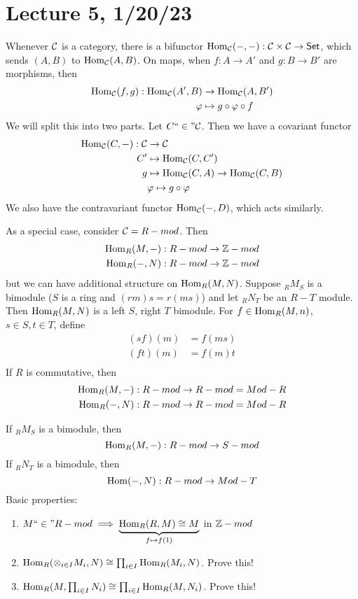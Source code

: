 \documentclass[x11names,reqno,14pt]{extarticle}
\newcommand{\fin}{``\in"}
\begin{document}
\section*{Lecture 5, 1/20/23}

Whenever $\mathcal{C}$ is a category, there is a bifunctor ${\mathrm{Hom}}_{\mathcal{C}}(-,-):\mathcal{C}\times\mathcal{C}\to{{\text{\sffamily {Set}}}}$, which sends $(A, B)$ to ${\mathrm{Hom}}_{\mathcal{C}}(A, B)$. On maps, when $f:A\to A'$ and $g:B\to B'$ are morphisms, then
\begin{align*}
{\mathrm{Hom}}_{\mathcal{C}}(f, g):{\mathrm{Hom}}_{\mathcal{C}}(A', B)& \to {\mathrm{Hom}}_{\mathcal{C}}(A, B') \\
\varphi&\mapsto g \circ \varphi \circ f \\
\end{align*}
We will split this into two parts. Let $C\fin\mc{C}$. Then we have a covariant functor 
\begin{align*}
{\mathrm{Hom}}_{\mathcal{C}}(C,-):\mathcal{C}&\to\mathcal{C}\\
C'&\mapsto{\mathrm{Hom}}_{\mathcal{C}}(C, C') \\
g&\mapsto{\mathrm{Hom}}_{\mathcal{C}}(C, A) \to{\mathrm{Hom}}_{\mathcal{C}}(C, B) \\
& \varphi  \mapsto g \circ \varphi \\
\end{align*}
We also have the contravariant functor ${\mathrm{Hom}}_{\mathcal{C}}(-, D)$, which acts similarly. 

As a special case, consider $\mathcal{C} = R-mod$. Then
\begin{align*}
{\mathrm{Hom}}_R(M, -):R-mod & \to \mathbb{Z}-mod \\
{\mathrm{Hom}}_R(-, N):R-mod & \to \mathbb{Z}-mod \\
\end{align*}
but we can have additional structure on ${\mathrm{Hom}}_R(M, N)$. Suppose $_RM_S$ is a bimodule ($S$ is a ring and $(rm)s = r(ms)$) and let $_RN_T$ be an $R-T$ module. Then ${\mathrm{Hom}}_R(M, N)$ is a left $S$, right $T$ bimodule. For $f \in {\mathrm{Hom}}_R(M, n)$, $s \in S, t \in T$, define 
\begin{align*}
(sf)(m) & = f(ms) \\
(ft)(m) & = f(m)t \\ 
\end{align*}
If $R$ is commutative, then 
\begin{align*}
{\mathrm{Hom}}_R(M, -):R-mod & \to R-mod = Mod-R \\
{\mathrm{Hom}}_R(-, N):R-mod & \to R-mod = Mod-R \\
\end{align*}

If $_RM_S$ is a bimodule, then 
\[
{\mathrm{Hom}}_R(M, -):R-mod \to S-mod
\]
If $_RN_T$ is a bimodule, then
\[
{\mathrm{Hom}}(-, N):R-mod\to Mod-T
\]
Basic properties: 
\begin{enumerate}[label=(\roman*)]
\item $M\fin R-mod \implies \underbrace{\Hom_R(R, M) \cong M}_{f\mapsto f(1)}$ in $\mathbb{Z}-mod$

\item ${\mathrm{Hom}}_R(\otimes_{i\in I}M_i, N) \cong \prod_{i\in I}{\mathrm{Hom}}_R(M_i, N)$. Prove this! 
\item ${\mathrm{Hom}}_R(M, \prod_{i\in I}N_i)\cong\prod_{i\in I}{\mathrm{Hom}}_R(M, N_i)$. Prove this!
\end{enumerate}
\end{document}
